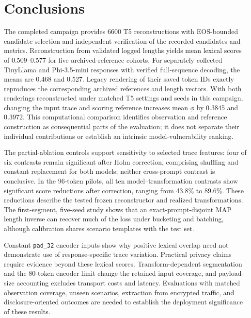 \documentclass[electronics,article,submit,pdftex,moreauthors]{Definitions/mdpi}
\begin{document}
\section{Conclusions}
The completed campaign provides 6600 T5 reconstructions with EOS-bounded candidate selection and independent verification of the recorded candidates and metrics. Reconstruction from validated logged lengths yields mean lexical scores of 0.509--0.577 for five archived-reference cohorts. For separately collected TinyLlama and Phi-3.5-mini responses with verified full-sequence decoding, the means are 0.468 and 0.527. Legacy rendering of their saved token IDs exactly reproduces the corresponding archived references and length vectors. With both renderings reconstructed under matched T5 settings and seeds in this campaign, changing the input trace and scoring reference increases mean $\phi$ by 0.3845 and 0.3972. This computational comparison identifies observation and reference construction as consequential parts of the evaluation; it does not separate their individual contributions or establish an intrinsic model-vulnerability ranking.

The partial-ablation controls support sensitivity to selected trace features: four of six contrasts remain significant after Holm correction, comprising shuffling and constant replacement for both models; neither cross-prompt contrast is conclusive. In the 96-token pilots, all ten model--transformation contrasts show significant score reductions after correction, ranging from 43.8\% to 89.6\%. These reductions describe the tested frozen reconstructor and realized transformations. The first-segment, five-seed study shows that an exact-prompt-disjoint MAP length inverse can recover much of the loss under bucketing and batching, although calibration shares scenario templates with the test set.

Constant \texttt{pad\_32} encoder inputs show why positive lexical overlap need not demonstrate use of response-specific trace variation. Practical privacy claims require evidence beyond these lexical scores. Transform-dependent segmentation and the 80-token encoder limit change the retained input coverage, and payload-size accounting excludes transport costs and latency. Evaluations with matched observation coverage, unseen scenarios, extraction from encrypted traffic, and disclosure-oriented outcomes are needed to establish the deployment significance of these results.

\appendixstart
\appendix
\end{document}
